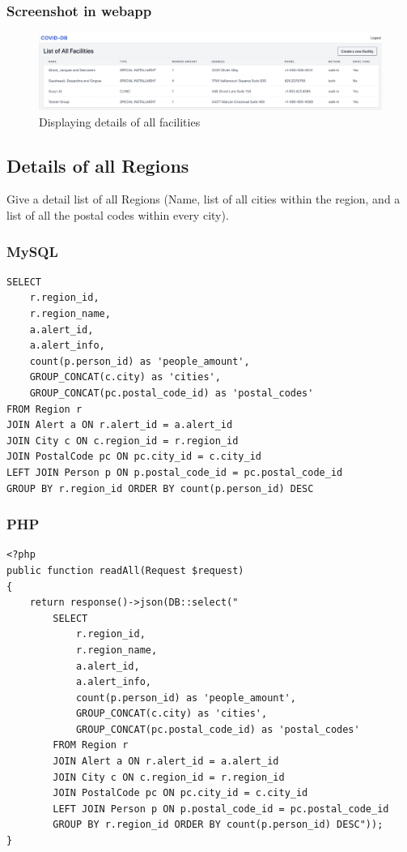 \documentclass{article}
\begin{document}
\subsubsection{Screenshot in webapp}

\begin{figure}[H]
    \centering
    \includegraphics[scale=0.32]{imgs/allfacilities.png}
    \caption{Displaying details of all facilities}
\end{figure}

\subsection{Details of all Regions}
Give a detail list of all Regions (Name, list of all cities within the region,
and a list of all the postal codes within every city). 


\subsubsection{MySQL}
\begin{verbatim}
SELECT
    r.region_id,
    r.region_name,
    a.alert_id,
    a.alert_info,
    count(p.person_id) as 'people_amount',
    GROUP_CONCAT(c.city) as 'cities',
    GROUP_CONCAT(pc.postal_code_id) as 'postal_codes'
FROM Region r
JOIN Alert a ON r.alert_id = a.alert_id
JOIN City c ON c.region_id = r.region_id
JOIN PostalCode pc ON pc.city_id = c.city_id
LEFT JOIN Person p ON p.postal_code_id = pc.postal_code_id
GROUP BY r.region_id ORDER BY count(p.person_id) DESC
\end{verbatim}

\subsubsection{PHP}
\begin{verbatim}
<?php
public function readAll(Request $request)
{
    return response()->json(DB::select("
        SELECT
            r.region_id,
            r.region_name,
            a.alert_id,
            a.alert_info,
            count(p.person_id) as 'people_amount',
            GROUP_CONCAT(c.city) as 'cities',
            GROUP_CONCAT(pc.postal_code_id) as 'postal_codes'
        FROM Region r
        JOIN Alert a ON r.alert_id = a.alert_id
        JOIN City c ON c.region_id = r.region_id
        JOIN PostalCode pc ON pc.city_id = c.city_id
        LEFT JOIN Person p ON p.postal_code_id = pc.postal_code_id
        GROUP BY r.region_id ORDER BY count(p.person_id) DESC"));
}

\end{verbatim}
\end{document}
